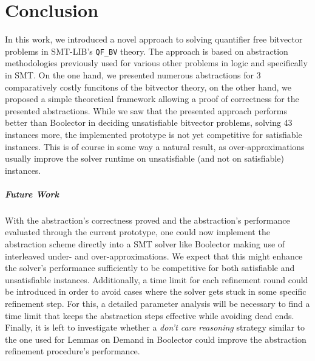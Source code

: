 \chapter{Conclusion}
\label{ch:Conclusion}
In this work, we introduced a novel approach to solving quantifier free bitvector problems in SMT-LIB's \texttt{QF\_BV} theory. The approach is based on abstraction methodologies previously used for various other problems in logic and specifically in SMT.
On the one hand, we presented numerous abstractions for 3 comparatively costly funcitons of the bitvector theory, on the other hand, we proposed a simple theoretical framework allowing a proof of correctness for the presented abstractions.
While we saw that the presented approach performs better than Boolector in deciding unsatisfiable bitvector problems, solving 43 instances more, the implemented prototype is not yet competitive for satisfiable instances. This is of course in some way a natural result, as over-approximations usually improve the solver runtime on unsatisfiable (and not on satisfiable) instances.

\paragraph{Future Work}
With the abstraction's correctness proved and the abstraction's performance evaluated through the current prototype, one could now implement the abstraction scheme directly into a SMT solver like Boolector making use of interleaved under- and over-approximations. We expect that this might enhance the solver's performance sufficiently to be competitive for both satisfiable and unsatisfiable instances.
Additionally, a time limit for each refinement round could be introduced in order to avoid cases where the solver gets stuck in some specific refinement step. For this, a detailed parameter analysis will be necessary to find a time limit that keeps the abstraction steps effective while avoiding dead ends. Finally, it is left to investigate whether a \textit{don't care reasoning} strategy similar to the one used for Lemmas on Demand in Boolector \cite{NiemetzPreinerBiere-FMCAD14} could improve the abstraction refinement procedure's performance.